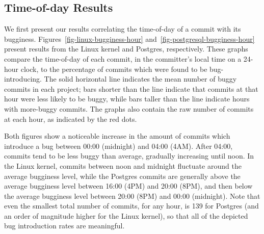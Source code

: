 

\subsection{Time-of-day Results} 
We first present our results correlating the time-of-day of a commit
with its bugginess.  Figures~\ref{fig-linux-bugginess-hour}
and~\ref{fig-postgresql-bugginess-hour} present results from the Linux kernel and
Postgres, respectively. These graphs compare the time-of-day of each
commit, in the committer's local time on a 24-hour clock, to the
percentage of commits which were found to be bug-introducing. The
solid horizontal line indicates the mean number of buggy commits in
each project; bars shorter than the line indicate that commits at that
hour were less likely to be buggy, while bars taller than the line
indicate hours with more-buggy commits. The graphs also contain the
raw number of commits at each hour, as indicated by the red dots.

Both figures show a noticeable increase in the amount of commits which
introduce a bug between 00:00 (midnight) and 04:00 (4AM). After 04:00,
commits tend to be less buggy than average, gradually increasing until
noon.  In the Linux kernel, commits between noon and midnight fluctuate around
the average bugginess level, while the Postgres commits are generally
above the average bugginess level between 16:00 (4PM) and 20:00 (8PM),
and then below the average bugginess level between 20:00 (8PM) and
00:00 (midnight). Note that even the smallest total number of commits,
for any hour, is 139 for Postgres (and an order of magnitude higher
for the Linux kernel), so that all of the depicted bug introduction rates are
meaningful.


